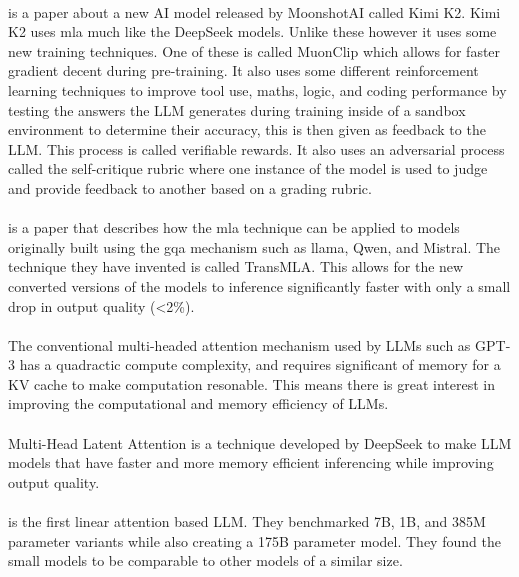 \paragraph{}\cite{team_kimi_2025} is a paper about a new AI model released by MoonshotAI called Kimi K2. Kimi K2 uses \acrlong{mla} much like the DeepSeek models. Unlike these however it uses some new training techniques. One of these is called MuonClip which allows for faster gradient decent during pre-training. It also uses some different reinforcement learning techniques to improve tool use, maths, logic, and coding performance by testing the answers the LLM generates during training inside of a sandbox environment to determine their accuracy, this is then given as feedback to the LLM. This process is called verifiable rewards. It also uses an adversarial process called the self-critique rubric where one instance of the model is used to judge and provide feedback to another based on a grading rubric.

\paragraph{}\cite{meng_transmla_2025} is a paper that describes how the \acrshort{mla} technique can be applied to models originally built using the \acrshort{gqa} mechanism such as \acrshort{llama}, Qwen, and Mistral. The technique they have invented is called TransMLA. This allows for the new converted versions of the models to inference significantly faster with only a small drop in output quality (<2\%).

\paragraph{}The conventional multi-headed attention mechanism used by LLMs such as GPT-3 has a quadractic compute complexity, and requires significant of memory for a KV cache to make computation resonable. This means there is great interest in improving the computational and memory efficiency of LLMs.

\paragraph{}Multi-Head Latent Attention is a technique developed by DeepSeek to make LLM models that have faster and more memory efficient inferencing while improving output quality.

\paragraph{}\cite{qin_transnormerllm_2023} is the first linear attention based LLM. They benchmarked 7B, 1B, and 385M parameter variants while also creating a 175B parameter model. They found the small models to be comparable to other models of a similar size.

